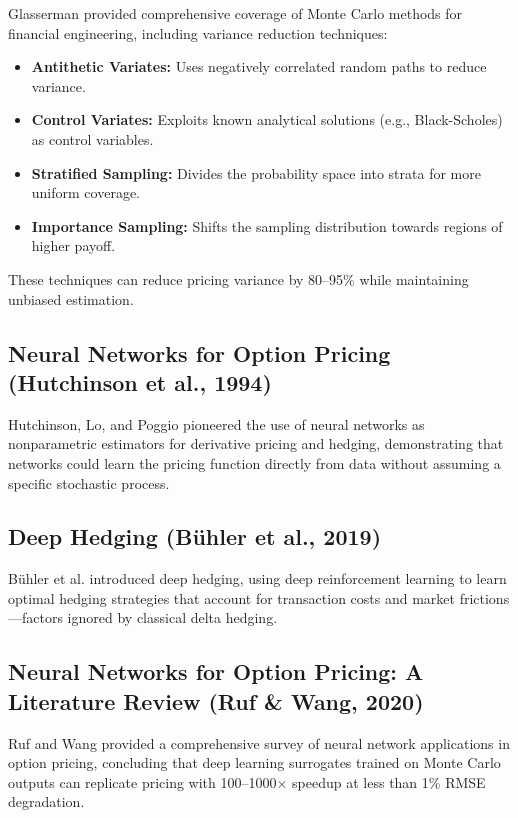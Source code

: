 \documentclass[12pt,a4paper]{report}
\begin{document}
Glasserman \cite{glasserman2003} provided comprehensive coverage of Monte Carlo methods for financial engineering, including variance reduction techniques:

\begin{itemize}
    \item \textbf{Antithetic Variates:} Uses negatively correlated random paths to reduce variance.
    \item \textbf{Control Variates:} Exploits known analytical solutions (e.g., Black-Scholes) as control variables.
    \item \textbf{Stratified Sampling:} Divides the probability space into strata for more uniform coverage.
    \item \textbf{Importance Sampling:} Shifts the sampling distribution towards regions of higher payoff.
\end{itemize}

These techniques can reduce pricing variance by 80--95\% while maintaining unbiased estimation.

\subsection{Neural Networks for Option Pricing (Hutchinson et al., 1994)}

Hutchinson, Lo, and Poggio \cite{hutchinson1994} pioneered the use of neural networks as nonparametric estimators for derivative pricing and hedging, demonstrating that networks could learn the pricing function directly from data without assuming a specific stochastic process.

\subsection{Deep Hedging (B\"{u}hler et al., 2019)}

B\"{u}hler et al. \cite{buhler2019} introduced deep hedging, using deep reinforcement learning to learn optimal hedging strategies that account for transaction costs and market frictions---factors ignored by classical delta hedging.

\subsection{Neural Networks for Option Pricing: A Literature Review (Ruf \& Wang, 2020)}

Ruf and Wang \cite{ruf2020} provided a comprehensive survey of neural network applications in option pricing, concluding that deep learning surrogates trained on Monte Carlo outputs can replicate pricing with 100--1000$\times$ speedup at less than 1\% RMSE degradation.
\end{document}
